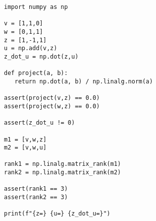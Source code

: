 \documentclass{article}
\begin{document}
\begin{verbatim}
import numpy as np

v = [1,1,0]
w = [0,1,1]
z = [1,-1,1]
u = np.add(v,z)
z_dot_u = np.dot(z,u)

def project(a, b):
   return np.dot(a, b) / np.linalg.norm(a)

assert(project(v,z) == 0.0)
assert(project(w,z) == 0.0)

assert(z_dot_u != 0)

m1 = [v,w,z]
m2 = [v,w,u]

rank1 = np.linalg.matrix_rank(m1)
rank2 = np.linalg.matrix_rank(m2)

assert(rank1 == 3)
assert(rank2 == 3)

print(f"{z=} {u=} {z_dot_u=}")
\end{verbatim}
\end{document}

